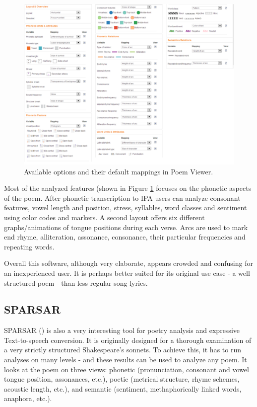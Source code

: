 \begin{figure}[h]\centering
	\includegraphics[scale=0.4]{../img/snapshotPV_options.pdf}
	\caption{Available options and their default mappings in Poem Viewer.}\label{screenshotPV-options}
\end{figure}

Most of the analyzed features (shown in Figure \ref{screenshotPV-options} focuses on the phonetic aspects of the poem. After phonetic transcription to IPA users can analyze consonant features, vowel length and position, stress, syllables, word classes and sentiment using color codes and markers. A second layout offers six different graphs/animations of tongue positions during each verse. Arcs are used to mark end rhyme, alliteration, assonance, consonance, their particular frequencies and repeating words.


Overall this software, although very elaborate, appears crowded and confusing for an inexperienced user. It is perhaps better suited for its original use case - a well structured poem - than less regular song lyrics.

\subsection{SPARSAR}
SPARSAR (\cite{Delmonte2014}) is also a very interesting tool for poetry analysis and expressive Text-to-speech conversion. It is originally designed for a thorough examination of a very strictly structured Shakespeare's sonnets. To achieve this, it has to run analyses on many levels - and these results can be used to analyze any poem. It looks at the poem on three views: phonetic (pronunciation, consonant and vowel tongue position, assonances, etc.), poetic (metrical structure, rhyme schemes, acoustic length, etc.), and semantic (sentiment, methaphorically linked words, anaphora, etc.).


